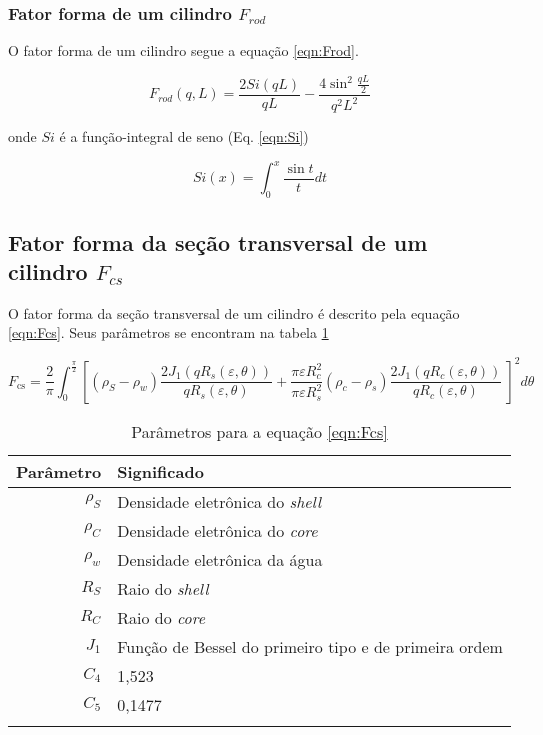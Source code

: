 \begin{apendicesenv}
	\subsubsection{Fator forma de um cilindro $F_{rod}$}
	
	O fator forma de um cilindro segue a equação \ref{eqn:Frod}.
	
	\begin{equation}
	F_{rod}(q, L) = \frac{2Si(qL)}{qL} - \frac{4\sin^2\frac{qL}{2}}{q^2L^2}
	\label{eqn:Frod}
	\end{equation}
	
	\noindent onde $Si$ é a função-integral de seno (Eq. \ref{eqn:Si})
	
	\begin{equation}
	Si(x) = \int_0^x \frac{\sin t}{t}dt
	\label{eqn:Si}
	\end{equation}
	
	\subsection{Fator forma da seção transversal de um cilindro $F_{cs}$}
	
	O fator forma da seção transversal de um cilindro é descrito pela equação \ref{eqn:Fcs}. Seus parâmetros se encontram na tabela \ref{tab_ap:Fcs}
	
	\begin{equation}
	F_{\text{cs}} = \frac{2}{\pi}\int_{0}^{\frac{\pi}{2}}%
	\left[ \left(\rho_{S} - \rho_{w} \right) \frac{2J_1 \left( qR_{s}\left( \varepsilon,\theta \right) \right)}{qR_{s}\left( \varepsilon,\theta \right)} %
	+  %
	\frac{\pi\varepsilon R_c^2}{\pi\varepsilon R_s^2}\left( \rho_c - \rho_s \right)	%
	\frac{2J_1\left( qR_{c}\left( \varepsilon,\theta \right) \right)}{qR_{c}\left( \varepsilon,\theta \right)}\  \right]^2 d\theta
	\label{eqn:Fcs}
	\end{equation}
	
	\begin{longtable}[c]{r l}
		\toprule
		Parâmetro 			& Significado \\
		\midrule
		$\rho_S$			&  Densidade eletrônica do \emph{shell} \\
		$\rho_C$			&  Densidade eletrônica do \emph{core}  \\
		$\rho_w$			&  Densidade eletrônica da água			\\
		$R_S$			& Raio do \emph{shell} 						\\
		$R_C$			& Raio do \emph{core}						\\
		$J_1$			&  Função de Bessel do primeiro tipo e de primeira ordem\\
		$C_4$			&  1,523	\\
		$C_5$			&  0,1477 	\\						
		\bottomrule
		\caption{Parâmetros para a equação \ref{eqn:Fcs}}
		\label{tab_ap:Fcs} 
	\end{longtable}
	

\end{apendicesenv}
